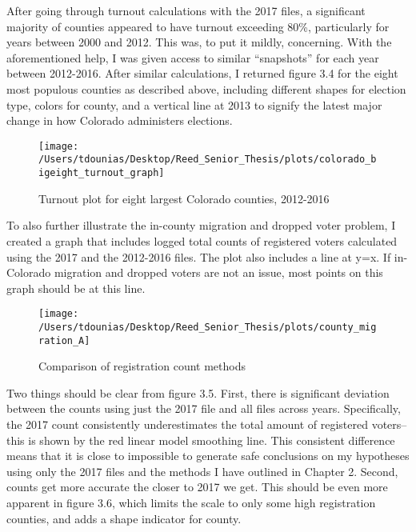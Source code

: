 \documentclass[12pt,twoside]{reedthesis}
\begin{document}
  After going through turnout calculations with the 2017 files, a
  significant majority of counties appeared to have turnout exceeding
  80\%, particularly for years between 2000 and 2012. This was, to put it
  mildly, concerning. With the aforementioned help, I was given access to
  similar ``snapshots'' for each year between 2012-2016. After similar
  calculations, I returned figure 3.4 for the eight most populous counties
  as described above, including different shapes for election type, colors
  for county, and a vertical line at 2013 to signify the latest major
  change in how Colorado administers elections.
  
  \begin{figure}
  
  {\centering \texttt{[image: /Users/tdounias/Desktop/Reed\_Senior\_Thesis/plots/colorado\_bigeight\_turnout\_graph]} 
  
  }
  
  \caption[Turnout plot for eight largest Colorado counties, 2012-2016]{Turnout plot for eight largest Colorado counties, 2012-2016}\label{fig:big eight turnout plot}
  \end{figure}
  
  To also further illustrate the in-county migration and dropped voter
  problem, I created a graph that includes logged total counts of
  registered voters calculated using the 2017 and the 2012-2016 files. The
  plot also includes a line at y=x. If in-Colorado migration and dropped
  voters are not an issue, most points on this graph should be at this
  line.
  
  \begin{figure}
  
  {\centering \texttt{[image: /Users/tdounias/Desktop/Reed\_Senior\_Thesis/plots/county\_migration\_A]} 
  
  }
  
  \caption[Comparison of registration count methods]{Comparison of registration count methods}\label{fig:county migration A}
  \end{figure}
  
  Two things should be clear from figure 3.5. First, there is significant
  deviation between the counts using just the 2017 file and all files
  across years. Specifically, the 2017 count consistently underestimates
  the total amount of registered voters--this is shown by the red linear
  model smoothing line. This consistent difference means that it is close
  to impossible to generate safe conclusions on my hypotheses using only
  the 2017 files and the methods I have outlined in Chapter 2. Second,
  counts get more accurate the closer to 2017 we get. This should be even
  more apparent in figure 3.6, which limits the scale to only some high
  registration counties, and adds a shape indicator for county.
  
\end{document}

